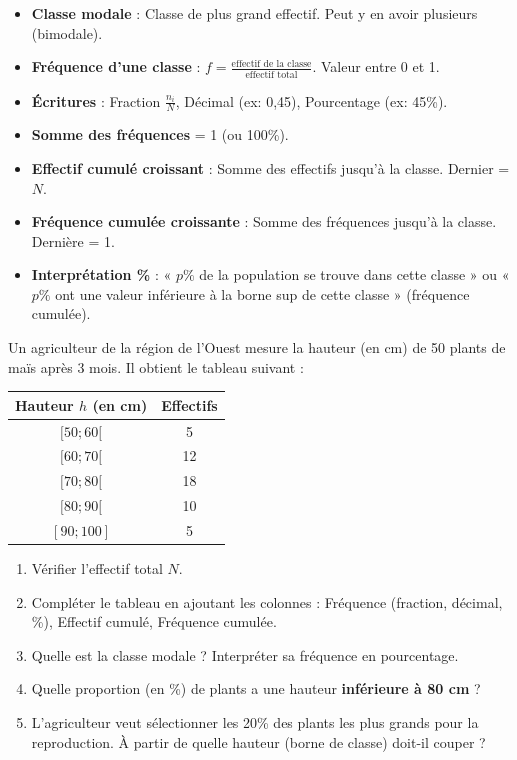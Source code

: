 \documentclass[11pt]{article}
\begin{document}
\begin{aretenir}
\begin{itemize}
    \item \textbf{Classe modale} : Classe de plus grand effectif. Peut y en avoir plusieurs (bimodale).
    \item \textbf{Fréquence d'une classe} : $f = \frac{\text{effectif de la classe}}{\text{effectif total}}$. Valeur entre 0 et 1.
    \item \textbf{Écritures} : Fraction $\frac{n_i}{N}$, Décimal (ex: 0,45), Pourcentage (ex: 45\%).
    \item \textbf{Somme des fréquences} = 1 (ou 100\%).
    \item \textbf{Effectif cumulé croissant} : Somme des effectifs jusqu'à la classe. Dernier = $N$.
    \item \textbf{Fréquence cumulée croissante} : Somme des fréquences jusqu'à la classe. Dernière = 1.
    \item \textbf{Interprétation \%} : « $p\%$ de la population se trouve dans cette classe » ou « $p\%$ ont une valeur inférieure à la borne sup de cette classe » (fréquence cumulée).
\end{itemize}
\end{aretenir}

\begin{exercice}
Un agriculteur de la région de l'Ouest mesure la hauteur (en cm) de 50 plants de maïs après 3 mois. Il obtient le tableau suivant :

\begin{center}
\begin{tabular}{|c|c|}\hline
\textbf{Hauteur $h$ (en cm)} & \textbf{Effectifs} \\ \hline
$[50 ; 60[$ & 5 \\ \hline
$[60 ; 70[$ & 12 \\ \hline
$[70 ; 80[$ & 18 \\ \hline
$[80 ; 90[$ & 10 \\ \hline
$[90 ; 100]$ & 5 \\ \hline
\end{tabular}
\end{center}

\begin{enumerate}
    \item Vérifier l'effectif total $N$.
    \item Compléter le tableau en ajoutant les colonnes : Fréquence (fraction, décimal, \%), Effectif cumulé, Fréquence cumulée.
    \item Quelle est la classe modale ? Interpréter sa fréquence en pourcentage.
    \item Quelle proportion (en \%) de plants a une hauteur \textbf{inférieure à 80 cm} ?
    \item L'agriculteur veut sélectionner les 20\% des plants les plus grands pour la reproduction. À partir de quelle hauteur (borne de classe) doit-il couper ?
\end{enumerate}
\end{exercice}
\end{document}

